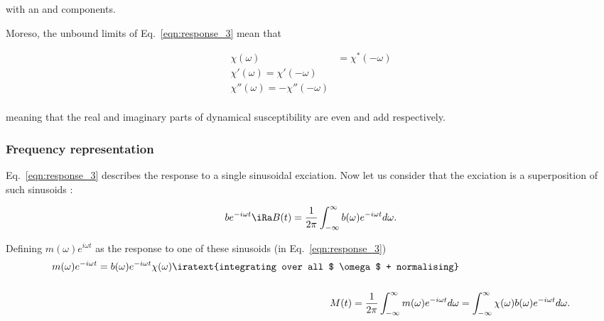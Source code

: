 	\noindent with an  and  components.
	
	Moreso, the unbound limits of Eq.~\eqref{eqn:response_3} mean that 
	
	\begin{equation}\label{key}
		\begin{aligned}
			\chi(\omega) & = \chi^{*}(-\omega)\\
			\chi'(\omega) = \chi'(-\omega)\\
			\chi''(\omega) = -\chi''(-\omega)\\
		\end{aligned}
	\end{equation}
	
	\noindent meaning that the real and imaginary parts of dynamical susceptibility are even and add respectively.
	
	
  \newpage\subsubsection{Frequency representation}
   Eq.~\eqref{eqn:response_3} describes the response to a single sinusoidal exciation. Now let us consider that the exciation is a superposition of such sinusoids :
   
   \begin{equation}\label{key}
   	be^{-i\omega t} \iRa B(t) = \frac{1}{2\pi}\int_{-\infty}^{\infty}b(\omega)e^{-i\omega t}d\omega.
   \end{equation}
   
   Defining $ m(\omega)e^{i\omega t} $ as the response to one of these sinusoids (in Eq.~\eqref{eqn:response_3}) %
   \begin{equation}\label{eqn:freq_1}
   \begin{aligned}
	   {m(\omega)e^{-i\omega t} = b(\omega)e^{-i\omega t}\chi(\omega)} \iratext{integrating over all $ \omega $ + normalising} &\\\\ \
	   	   M(t) = \frac{1}{2\pi}\int_{-\infty}^{\infty}m(\omega)e^{-i\omega t}d\omega &= \int_{-\infty}^{\infty}\chi(\omega)b(\omega)e^{-i\omega t}d\omega.
   \end{aligned}
   \end{equation}
   
